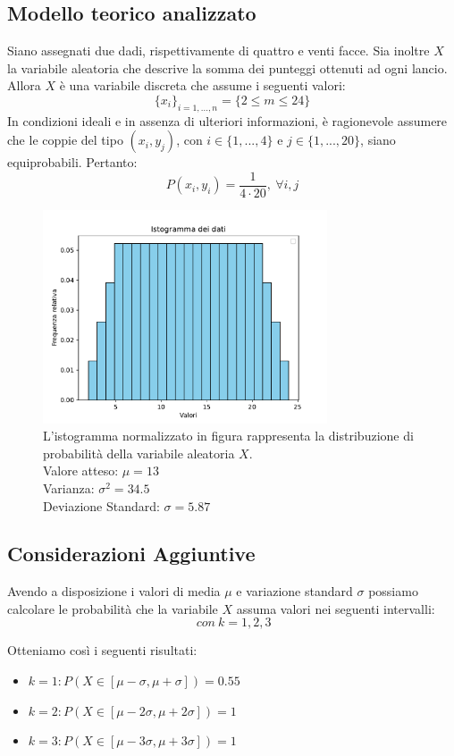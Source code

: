 \subsection{Modello teorico analizzato}
Siano assegnati due dadi, rispettivamente di quattro e venti facce. Sia inoltre $X$ la variabile aleatoria che descrive la somma dei punteggi ottenuti ad ogni lancio. Allora $X$ è una variabile discreta che assume i seguenti valori:
\begin{equation}
	\{x_i\}_{i=1,...,n} = \{2 \leq m \leq 24\}
\end{equation}
In condizioni ideali e in assenza di ulteriori informazioni, è ragionevole assumere che le coppie del tipo $(x_i, y_j)$, con $i \in \{1,...,4\}$ e $j \in \{1,...,20\}$, siano equiprobabili. Pertanto:
\begin{equation}
	P(x_i, y_i) = \frac{1}{4 \cdot 20},\ \forall i, j
\end{equation}
\begin{figure}[H]
	\centering
	\includegraphics[width=0.75\textwidth]{istogramma1.pdf}
	\caption{L'istogramma normalizzato in figura rappresenta la distribuzione di probabilità della variabile aleatoria $X$. \\
	Valore atteso: $\mu=13$ \\
	Varianza: $\sigma^2=34.5$ \\
	Deviazione Standard: $\sigma=5.87$}
\end{figure}

\subsection{Considerazioni Aggiuntive}
Avendo a disposizione i valori di media $\mu$ e variazione standard $\sigma$ possiamo calcolare le probabilità che la variabile $X$ assuma valori nei seguenti intervalli:
\begin{equation*}
	[\mu-k\sigma, \mu+k\sigma]\ con\ k=1,2,3
\end{equation*} 

Otteniamo così i seguenti risultati:
\begin{itemize}
    \item $k=1: P(X \in [\mu-\sigma, \mu+\sigma]) = 0.55$
    \item $k=2: P(X \in [\mu-2\sigma, \mu+2\sigma]) = 1$
    \item $k=3: P(X \in [\mu-3\sigma, \mu+3\sigma]) = 1$
\end{itemize}




